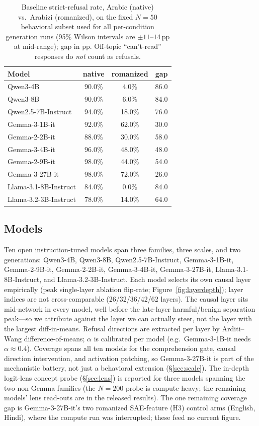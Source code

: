 \documentclass[11pt]{article}
\newcommand{\pp}{\,pp}
\begin{document}
\begin{table}[t]
\centering
\small
\begin{tabular}{lccc}
\toprule
Model & native & romanized & gap \\
\midrule
Qwen3-4B & 90.0\% & 4.0\% & 86.0 \\
Qwen3-8B & 90.0\% & 6.0\% & 84.0 \\
Qwen2.5-7B-Instruct & 94.0\% & 18.0\% & 76.0 \\
Gemma-3-1B-it & 92.0\% & 62.0\% & 30.0 \\
Gemma-2-2B-it & 88.0\% & 30.0\% & 58.0 \\
Gemma-3-4B-it & 96.0\% & 48.0\% & 48.0 \\
Gemma-2-9B-it & 98.0\% & 44.0\% & 54.0 \\
Gemma-3-27B-it & 98.0\% & 72.0\% & 26.0 \\
Llama-3.1-8B-Instruct & 84.0\% & 0.0\% & 84.0 \\
Llama-3.2-3B-Instruct & 78.0\% & 14.0\% & 64.0 \\
\bottomrule
\end{tabular}
\caption{Baseline strict-refusal rate, Arabic (native) vs.\ Arabizi (romanized), on the fixed $N{=}50$ behavioral subset used for all per-condition generation runs (95\% Wilson intervals are ${\pm}11$--$14$\pp{} at mid-range); gap in pp. Off-topic ``can't-read'' responses do \emph{not} count as refusals.}
\label{tab:gap}
\end{table}

\subsection{Models}
\label{sec:models}
Ten open instruction-tuned models span three families, three scales, and two generations: Qwen3-4B, Qwen3-8B, Qwen2.5-7B-Instruct, Gemma-3-1B-it, Gemma-2-9B-it, Gemma-2-2B-it, Gemma-3-4B-it, Gemma-3-27B-it, Llama-3.1-8B-Instruct, and Llama-3.2-3B-Instruct. Each model selects its own causal layer empirically (peak single-layer ablation flip-rate; Figure~\ref{fig:layerdepth}); layer indices are not cross-comparable (26/32/36/42/62 layers). The causal layer sits mid-network in every model, well before the late-layer harmful/benign separation peak---so we attribute against the layer we can actually steer, not the layer with the largest diff-in-means. Refusal directions are extracted per layer by Arditi--Wang difference-of-means; $\alpha$ is calibrated per model (e.g.\ Gemma-3-1B-it needs $\alpha{\approx}0.4$). Coverage spans all ten models for the comprehension gate, causal direction intervention, and activation patching, so Gemma-3-27B-it is part of the mechanistic battery, not just a behavioral extension (\S\ref{sec:scale}). The in-depth logit-lens concept probe (\S\ref{sec:lens}) is reported for three models spanning the two non-Gemma families (the $N{=}200$ probe is compute-heavy; the remaining models' lens read-outs are in the released results). The one remaining coverage gap is Gemma-3-27B-it's two romanized SAE-feature (H3) control arms (English, Hindi), where the compute run was interrupted; these feed no current figure.
\end{document}
